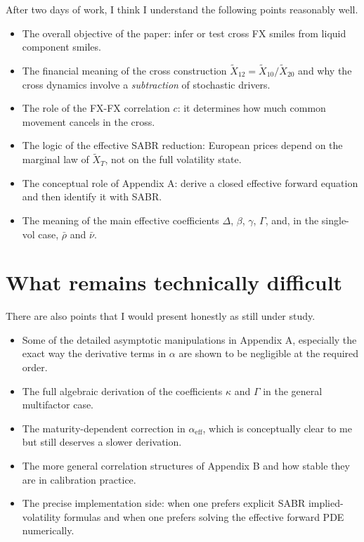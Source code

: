 \documentclass[11pt]{article}
\newcommand{\X}{\widetilde{X}}
\begin{document}
After two days of work, I think I understand the following points reasonably well.

\begin{itemize}
    \item The overall objective of the paper: infer or test cross FX smiles from liquid component smiles.
    \item The financial meaning of the cross construction \(\X_{12}=\X_{10}/\X_{20}\) and why the cross dynamics involve a \emph{subtraction} of stochastic drivers.
    \item The role of the FX-FX correlation \(c\): it determines how much common movement cancels in the cross.
    \item The logic of the effective SABR reduction: European prices depend on the marginal law of \(\X_T\), not on the full volatility state.
    \item The conceptual role of Appendix A: derive a closed effective forward equation and then identify it with SABR.
    \item The meaning of the main effective coefficients \(\Delta\), \(\beta\), \(\gamma\), \(\Gamma\), and, in the single-vol case, \(\bar\rho\) and \(\bar\nu\).
\end{itemize}

\section{What remains technically difficult}

There are also points that I would present honestly as still under study.

\begin{itemize}
    \item Some of the detailed asymptotic manipulations in Appendix A, especially the exact way the derivative terms in \(\alpha\) are shown to be negligible at the required order.
    \item The full algebraic derivation of the coefficients \(\kappa\) and \(\Gamma\) in the general multifactor case.
    \item The maturity-dependent correction in \(\alpha_{\mathrm{eff}}\), which is conceptually clear to me but still deserves a slower derivation.
    \item The more general correlation structures of Appendix B and how stable they are in calibration practice.
    \item The precise implementation side: when one prefers explicit SABR implied-volatility formulas and when one prefers solving the effective forward PDE numerically.
\end{itemize}
\end{document}
